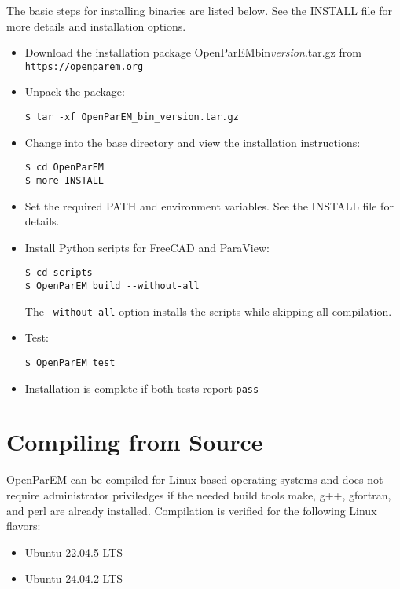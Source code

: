 \documentclass[titlepage]{article}
\renewcommand\_{\textunderscore\linebreak[1]}
\begin{document}
The basic steps for installing binaries are listed below.  See the INSTALL file for more details and installation options.
\begin{itemize}[nosep]
   \item Download the installation package OpenParEM\_bin\_\textit{version}.tar.gz from \verb+https://openparem.org+
   \item Unpack the package:
         \begin{Verbatim}
$ tar -xf OpenParEM_bin_version.tar.gz
         \end{Verbatim}
   \item Change into the base directory and view the installation instructions:
         \begin{Verbatim}
$ cd OpenParEM
$ more INSTALL
         \end{Verbatim}
   \item Set the required PATH and environment variables.  See the INSTALL file for details.
   \item Install Python scripts for FreeCAD and ParaView:
         \begin{Verbatim}
$ cd scripts
$ OpenParEM_build --without-all
         \end{Verbatim}
         The \texttt{--without-all} option installs the scripts while skipping all compilation.
   \item Test:
         \begin{Verbatim}
$ OpenParEM_test
         \end{Verbatim}
   \item Installation is complete if both tests report \texttt{pass}
\end{itemize}

\section{Compiling from Source}

OpenParEM can be compiled for Linux-based operating systems and does not require administrator priviledges if the needed build tools make, g++, gfortran, and perl are already installed. Compilation is verified for the following Linux flavors:
\begin{itemize}[nosep]
   \item Ubuntu 22.04.5 LTS
   \item Ubuntu 24.04.2 LTS
\end{itemize}
\end{document}
